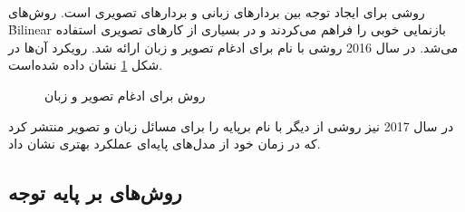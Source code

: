 \paragraph{}{
    روشی برای ایجاد توجه بین بردار‌های زبانی و بردار‌های تصویری است. 
    روش‌های 
    \r{Bilinear}
    بازنمایی خوبی را فراهم می‌کردند و در بسیاری از کارهای تصویری استفاده می‌شد. 
    در سال 2016
    روشی با نام 
    \cite{fukui-etal-2016-multimodal}
    برای ادغام تصویر و زبان ارائه شد. رویکرد آن‌ها در شکل 
    \ref{fig:mcb}
    نشان داده شده‌است. 
    \begin{figure}[H]
        \caption{روش  برای ادغام تصویر و زبان}
        \label{fig:mcb}
    \end{figure}
    در سال 2017 نیز روشی از 
    دیگر
    با نام 
    \cite{kim2016hadamard}
    برپایه 
    را برای مسائل زبان و تصویر منتشر کرد که در زمان خود از 
    مدل‌های پایه‌ای عملکرد بهتری نشان داد. 
}

\subsection{
    روش‌های بر پایه توجه
}
\label{sec:attn_vqa_approach}
